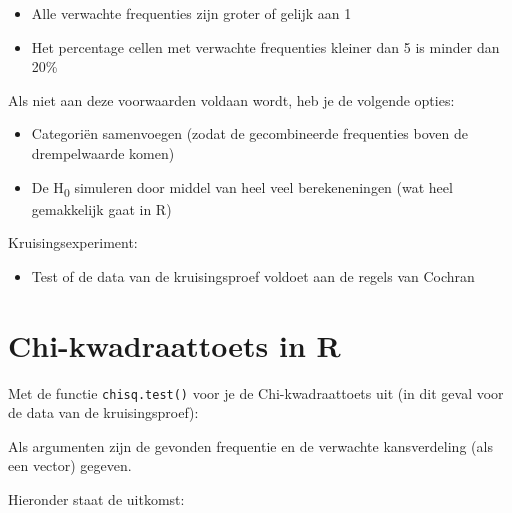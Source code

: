 \documentclass[]{book}
\newenvironment{Shaded}{\begin{snugshade}}{\end{snugshade}}
\newcommand{\KeywordTok}[1]{\textcolor[rgb]{0.13,0.29,0.53}{\textbf{{#1}}}}
\newcommand{\DataTypeTok}[1]{\textcolor[rgb]{0.13,0.29,0.53}{{#1}}}
\newcommand{\DecValTok}[1]{\textcolor[rgb]{0.00,0.00,0.81}{{#1}}}
\newcommand{\NormalTok}[1]{{#1}}
\providecommand{\tightlist}{%
  \setlength{\itemsep}{0pt}\setlength{\parskip}{0pt}}
\theoremstyle{definition}
\theoremstyle{definition}
\theoremstyle{definition}
\theoremstyle{remark}
\let\BeginKnitrBlock\begin \let\EndKnitrBlock\end
\begin{document}
\begin{itemize}
\tightlist
\item
  Alle verwachte frequenties zijn groter of gelijk aan 1
\item
  Het percentage cellen met verwachte frequenties kleiner dan 5 is
  minder dan 20\%
\end{itemize}

Als niet aan deze voorwaarden voldaan wordt, heb je de volgende opties:

\begin{itemize}
\tightlist
\item
  Categoriën samenvoegen (zodat de gecombineerde frequenties boven de
  drempelwaarde komen)
\item
  De H\textsubscript{0} simuleren door middel van heel veel
  berekeneningen (wat heel gemakkelijk gaat in R)
\end{itemize}

\BeginKnitrBlock{exercise}
\protect\hypertarget{exr:cochran}{}{\label{exr:cochran}
}Kruisingsexperiment:

\begin{itemize}
\tightlist
\item
  Test of de data van de kruisingsproef voldoet aan de regels van
  Cochran
\end{itemize}
\EndKnitrBlock{exercise}

\section{Chi-kwadraattoets in R}\label{chi-kwadraattoets-in-r}

Met de functie \texttt{chisq.test()} voor je de Chi-kwadraattoets uit
(in dit geval voor de data van de kruisingsproef):

\begin{Shaded}
\end{Shaded}

Als argumenten zijn de gevonden frequentie en de verwachte kansverdeling
(als een vector) gegeven.

Hieronder staat de uitkomst:
\end{document}
